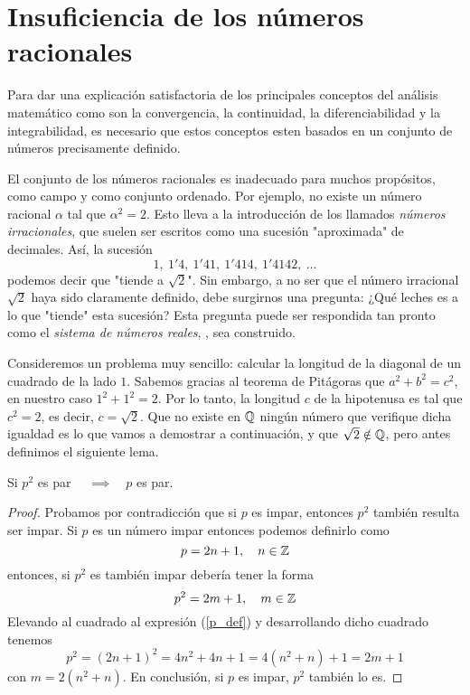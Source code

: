 {\section{Insuficiencia de los números racionales}
Para dar una explicación satisfactoria de los principales conceptos del análisis matemático como son la convergencia, la continuidad, la diferenciabilidad y la integrabilidad, es necesario que estos conceptos esten basados en un conjunto de números precisamente definido.

El conjunto de los números racionales es inadecuado para muchos propósitos, como campo y como conjunto ordenado. Por ejemplo, no existe un número racional $\alpha$ tal que $\alpha^2 = 2$. Esto lleva a la introducción de los llamados \textit{números irracionales}, que suelen ser escritos como una sucesión "aproximada" de decimales. Así, la sucesión
\begin{equation}
    1,\ 1'4,\ 1'41,\ 1'414,\ 1'4142,\ \ldots
\end{equation}
podemos decir que "tiende a $\sqrt{2}$". Sin embargo, a no ser que el número irracional $\sqrt{2}$ haya sido claramente definido, debe surgirnos una pregunta: ¿Qué leches es a lo que "tiende" esta sucesión? Esta pregunta puede ser respondida tan pronto como el \textit{sistema de números reales}, \R,  sea construido.

Consideremos un problema muy sencillo: calcular la longitud de la diagonal de un cuadrado de la lado $1$. Sabemos gracias al teorema de Pitágoras que $a^2 + b^2 = c^2$, en nuestro caso $1^2 + 1^2 = 2$. Por lo tanto, la longitud $c$ de la hipotenusa es tal que $c^2 = 2$, es decir, $c = \sqrt{2}$. Que no existe en $\mathbb{Q}$ ningún número que verifique dicha igualdad es lo que vamos a demostrar a continuación, y que $\sqrt{2}\notin\mathbb{Q}$, pero antes definimos el siguiente lema.

\begin{lemma}
    Si $p^2$ es par $\quad\implies\quad p$ es par.
\end{lemma}

\begin{proof}
    Probamos por contradicción que si $p$ es impar, entonces $p^2$ también resulta ser impar. Si $p$ es un número impar entonces podemos definirlo como
    \begin{equation}
        \label{p_def}
        p = 2n + 1, \quad n\in\mathbb{Z}
    \end{equation}
    entonces, si $p^2$ es también impar debería tener la forma
    \begin{equation}
        p^2 = 2m + 1, \quad m\in\mathbb{Z}
    \end{equation}
    Elevando al cuadrado al expresión (\ref{p_def}) y desarrollando dicho cuadrado tenemos
    \begin{equation}
        p^2 = \left( 2n + 1 \right)^2 = 4n^2 + 4n + 1 = 4\left( n^2 + n \right) + 1 = 2m + 1
    \end{equation}
    con $m = 2\left( n^2 + n \right) $. En conclusión, si $p$ es impar, $p^2$ también lo es.


\end{proof}}
